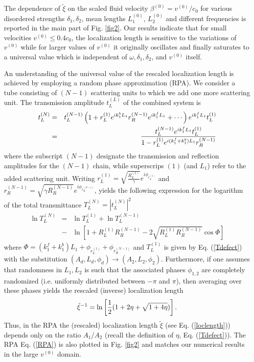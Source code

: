 \documentclass[aps,prl,twocolumn,groupedaddress,amsmath,amssymb]{revtex4}
\begin{document}
The dependence of ${\tilde \xi}$ on the scaled fluid velocity $\beta^{(0)}=v^{(0)}/c_0$ for various disordered strengths 
$\delta_1,\delta_2$, mean lengths $L_1^{(0)}$, $L_2^{(0)}$ and different frequencies is reported in the main part of Fig. \ref{fig2}. Our 
results indicate that for small velocities $v^{(0)}\leq 0.4 c_0$, the localization length is sensitive to the variations of $v^{(0)}$ while for
larger values of $v^{(0)}$ it originally oscillates and finally saturates to a universal value which is independent of $\omega, \delta_1,
\delta_2$, and $v^{(0)}$ itself.

An understanding of the universal value of the rescaled localization length is achieved by employing a random phase approximation (RPA).  
We consider a tube consisting of $(N-1)$ scattering units to which we add one more scattering unit. The transmission amplitude $t_L^{(L)}$
of the combined system is
\begin{eqnarray}
\label{ttot}
t_L^{(N)}&=&t_L^{(N-1)} \left(1+r_L^{(1)}e^{ik_1^bL_1}r_R^{(N-1)}e^{ik_1^fL_1}+\cdots\right)e^{ik_1^fL_1}t_L^{(1)}\nonumber\\
                 &=&{t_L^{(N-1)} e^{ik_1^fL_1}t_L^{(1)}\over 1- r_L^{(1)}e^{i(k_1^f+k_1^b)L_1}r_R^{(N-1)}}
\end{eqnarray}
where the subscript $(N-1)$ designate the transmission and reflection amplitudes for the $(N-1)$ chain, while superscrips $(1)$ (and $L_1$)
refer to the added scattering unit.
Writing $r_L^{(1)}=\sqrt{\frac{R_L^{(1)}}{\gamma}} e^{i\phi_{r_L^{(1)}}}$ and $r_R^{(N-1)}=\sqrt{\gamma R_R^{(N-1)}} 
e^{i\phi_{r_R^{(N-1)}}}$, yields the following expression for the logarithm of the total transmittance $T_L^{(N)}=|t_L^{(N)}|^2$
\begin{eqnarray}
\label{Tlog}
\ln T_L^{(N)}&=&\ln T_L^{(1)} +\ln T_L^{(N-1)} \\
&-&\ln\left[1+ R_L^{(1)} R_R^{(N-1)}-2\sqrt{R_L^{(1)}R_R^{(N-1)}} \cos\Phi\right]\nonumber
\end{eqnarray}
where $\Phi=(k_1^f+k_1^b)L_1+\phi_{r_L^{(1)}}+\phi_{r_R^{(N-1)}}$ and $T_L^{(1)}$ is given by Eq. (\ref{Tdefect}) with the substitution 
$(A_d,L_d, \phi_d)\rightarrow (A_2,L_2,\phi_2)$. Furthermore, if one assumes that randomness in $L_1, L_2$ is such that the associated 
phases $\phi_{1,2}$ are completely randomized (i.e. uniformly distributed between $-\pi$ and $\pi$), then averaging over these  
phases yields the rescaled (inverse) localization length
\begin{equation}
\label{RPA}
{\tilde \xi}^{-1} = \ln\left[{1\over 2} (1+2\eta + \sqrt{1+4\eta})\right].
\end{equation}
Thus, in the RPA the (rescaled) localization length ${\tilde \xi}$ (see Eq. (\ref{loclength})) depends only on the ratio $A_1/A_2$ (recall the definition
of $\eta$, Eq. (\ref{Tdefect})). The RPA Eq. (\ref{RPA}) is also plotted in Fig. \ref{fig2} and matches our numerical results in the large 
$v^{(0)}$ domain. 
\end{document}
